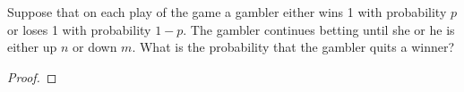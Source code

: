 \begin{problem}{4.56}
  Suppose that on each play of the game a gambler either wins 1 with probability $p$
  or loses 1 with probability $1 - p$. The gambler continues betting until she or
  he is either up $n$ or down $m$. What is the probability that the gambler quits a winner?
\end{problem}

\begin{proof}
\end{proof}
\newpage
